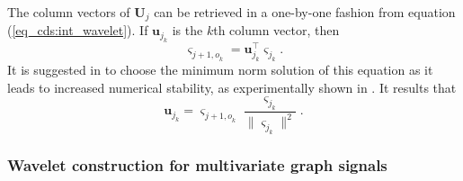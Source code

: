 \documentclass[graybox]{svmult}
\begin{document}
	The column vectors of $\mathbf{U}_j$ can be retrieved in a one-by-one fashion from equation (\ref{eq_cds:int_wavelet}). If $\mathbf{u}_{j_k}$ is the $k$th column vector, then
	\begin{equation}
	\varsigma_{{j+1,o}_k} = \mathbf{u}_{j_k}^\intercal \varsigma_{j_k}.
	\label{eq_cds:integral_odd_node}
	\end{equation}
	It is suggested in \cite{Jansen2013} to choose the minimum norm solution of this equation as it leads to increased numerical stability, as experimentally shown in \cite{Cioaca2016}. It results that
	\begin{equation}
	\mathbf{u}_{j_k} =\varsigma_{{j+1,o}_k} \frac{ \varsigma_{j_k} } { \| \varsigma_{j_k} \|^2 }.
	\label{eq_cds:update_column_vector}
	\end{equation}
	
	
	\subsubsection{Wavelet construction for multivariate graph signals}
	
\end{document}
